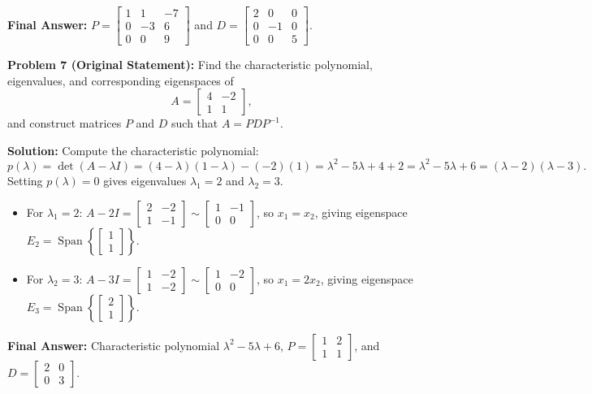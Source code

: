 \documentclass[11pt, letterpaper]{article}
\theoremstyle{definition}
\theoremstyle{remark}
\begin{document}
\textbf{Final Answer:} $P = \begin{bmatrix} 1 & 1 & -7 \\ 0 & -3 & 6 \\ 0 & 0 & 9 \end{bmatrix}$ and $D = \begin{bmatrix} 2 & 0 & 0 \\ 0 & -1 & 0 \\ 0 & 0 & 5 \end{bmatrix}$.

\vspace{0.8em}
\textbf{Problem 7 (Original Statement):}
Find the characteristic polynomial, eigenvalues, and corresponding eigenspaces of
\[
A = \begin{bmatrix} 4 & -2 \\ 1 & 1 \end{bmatrix},
\]
and construct matrices $P$ and $D$ such that $A = PDP^{-1}$.

\textbf{Solution:}
Compute the characteristic polynomial:
\[
p(\lambda) = \det(A - \lambda I) = (4 - \lambda)(1 - \lambda) - (-2)(1) = \lambda^{2} - 5\lambda + 4 + 2 = \lambda^{2} - 5\lambda + 6 = (\lambda - 2)(\lambda - 3).
\]
Setting $p(\lambda) = 0$ gives eigenvalues $\lambda_{1} = 2$ and $\lambda_{2} = 3$.
\begin{itemize}
    \item For $\lambda_{1} = 2$: $A - 2I = \begin{bmatrix} 2 & -2 \\ 1 & -1 \end{bmatrix} \sim \begin{bmatrix} 1 & -1 \\ 0 & 0 \end{bmatrix}$, so $x_{1} = x_{2}$, giving eigenspace $E_{2} = \operatorname{Span}\left\{\begin{bmatrix} 1 \\ 1 \end{bmatrix}\right\}$.
    \item For $\lambda_{2} = 3$: $A - 3I = \begin{bmatrix} 1 & -2 \\ 1 & -2 \end{bmatrix} \sim \begin{bmatrix} 1 & -2 \\ 0 & 0 \end{bmatrix}$, so $x_{1} = 2x_{2}$, giving eigenspace $E_{3} = \operatorname{Span}\left\{\begin{bmatrix} 2 \\ 1 \end{bmatrix}\right\}$.
\end{itemize}
\textbf{Final Answer:} Characteristic polynomial $\lambda^{2} - 5\lambda + 6$, $P = \begin{bmatrix} 1 & 2 \\ 1 & 1 \end{bmatrix}$, and $D = \begin{bmatrix} 2 & 0 \\ 0 & 3 \end{bmatrix}$.
\end{document}
